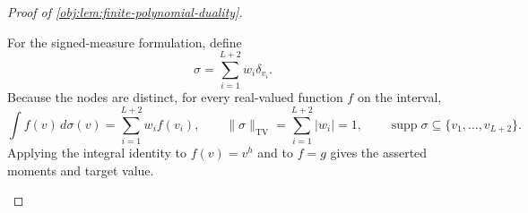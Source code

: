 \begin{proof}[Proof of \cref{obj:lem:finite-polynomial-duality}]
\begin{enumerate}
For the signed-measure formulation, define
\[
\sigma=\sum_{i=1}^{L+2}w_i\delta_{v_i}.
\]
Because the nodes are distinct, for every real-valued function \(f\) on the interval,
\[
\int f(v)\,d\sigma(v)=\sum_{i=1}^{L+2}w_if(v_i),
\qquad
\|\sigma\|_{\mathrm{TV}}=\sum_{i=1}^{L+2}|w_i|=1,
\qquad
\operatorname{supp}\sigma\subseteq\{v_1,\ldots,v_{L+2}\}.
\]
Applying the integral identity to \(f(v)=v^h\) and to \(f=g\) gives the asserted moments and target value.
\end{enumerate}
\end{proof}
